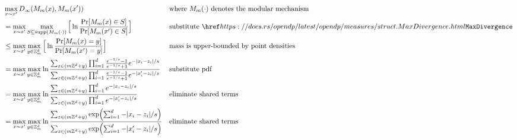 \documentclass{article}
\begin{document}
\begin{align}
    &\max_{x \sim x'} D_\infty(M_m(x), M_m(x')) &&\text{where } M_m(\cdot) \text{ denotes the modular mechanism} \\
    &=\max_{x \sim x'} \max_{S \subseteq \textrm{supp}(M_m(\cdot))} \Big[\ln \dfrac{\Pr[M_m(x) \in S]}{\Pr[M_m(x') \in S]} \Big]
        &&\text{substitute } \rustdoc{measures/struct}{MaxDivergence} \\
    &\leq\max_{x \sim x'} \max_{y \in \mathbb{Z}^d_m} \Big[\ln \dfrac{\Pr[M_m(x) = y]}{\Pr[M_m(x') = y]} \Big] 
        &&\text{mass is upper-bounded by point densities}\\
    &=\max_{x \sim x'} \max_{y \in \mathbb{Z}^d_m} \ln \dfrac{\sum_{z \in (m\mathbb{Z}^d + y)} \prod_{i=1}^d \frac{e^{-1/s} - 1}{e^{-1/s} + 1} e^{-|x_i - z_i|/s}}{\sum_{z \in (m\mathbb{Z}^d + y)} \prod_{i=1}^d\frac{e^{-1/s} - 1}{e^{-1/s} + 1} e^{-|x'_i-z_i|/s}}
        &&\text{substitute pdf}\\
    &=\max_{x \sim x'} \max_{y \in \mathbb{Z}^d_m} \ln \dfrac{\sum_{z \in (m\mathbb{Z}^d + y)} \prod_{i=1}^d e^{-|x_i - z_i|/s}}{\sum_{z \in (m\mathbb{Z}^d + y)} \prod_{i=1}^d e^{-|x'_i-z_i|/s}}
        &&\text{eliminate shared terms}\\
    &=\max_{x \sim x'} \max_{y \in \mathbb{Z}^d_m} \ln \dfrac{\sum_{z \in (m\mathbb{Z}^d + y)} \exp(\sum_{i=1}^d -|x_i - z_i|/s)}{\sum_{z \in (m\mathbb{Z}^d + y)} \exp(\sum_{i=1}^d -|x'_i-z_i|/s)}
        &&\text{eliminate shared terms}
\end{align}
\end{document}
